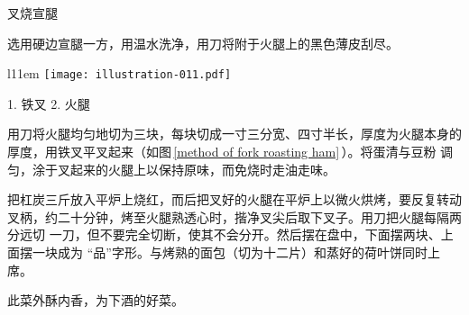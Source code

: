\begin{recipe}{叉烧宣腿}

\ingredients


\preparation

\step 选用硬边宣腿一方，用温水洗净，用刀将附于火腿上的黑色薄皮刮尽。

\begin{wrapfigure}[13]{l}{11em}%
\centering%
\vspace{-.75\baselineskip}%
\texttt{[image: illustration-011.pdf]}%
\vspace{-.4375\baselineskip}%
\caption{叉烧宣腿叉法}
\label{method of fork roasting ham}%
\begingroup%
\small%
\noindent%
\null\hspace{0em}1. 铁叉 2. 火腿
\endgroup%
\end{wrapfigure}

\step 用刀将火腿均匀地切为三块，每块切成一寸三分宽、四寸半长，厚度为火腿本身的
厚度，用铁叉平叉起来（如图\,\ref{method of fork roasting ham}\,）。将蛋清与豆粉
调匀，涂于叉起来的火腿上以保持原味，而免烧时走油走味。

\step 把杠炭三斤放入平炉上烧红，而后把叉好的火腿在平炉上以微火烘烤，要反复转动
叉柄，约二十分钟，烤至火腿熟透心时，揩净叉尖后取下叉子。用刀把火腿每隔两分远切
一刀，但不要完全切断，使其不会分开。然后摆在盘中，下面摆两块、上面摆一块成为
“品”字形。与烤熟的面包（切为十二片）和蒸好的荷叶饼同时上席。

\features

此菜外酥内香，为下酒的好菜。

\end{recipe}

